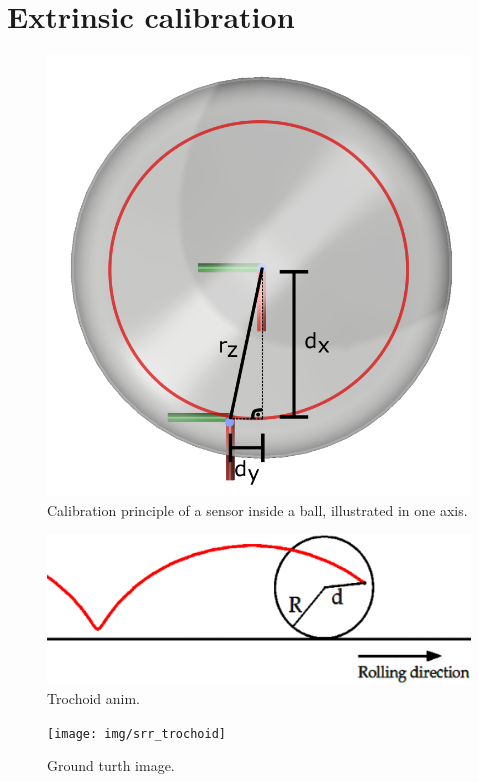 \section{Extrinsic calibration}

\begin{figure}
  \centering
  \includegraphics[width=.5\linewidth]{img/calibsphere}
  \caption{Calibration principle of a sensor inside a ball, illustrated in one axis.}
  \label{fig:calibsphere}
\end{figure}

\begin{figure}
  \centering
  \includegraphics[width=\linewidth]{img/trochoidanim}
  \caption{Trochoid anim.}
  \label{fig:trochoidanim}
\end{figure}

\begin{figure}
  \centering
  \texttt{[image: img/srr\_trochoid]}
  \caption{Ground turth image.}
  \label{fig:srrtrochoid}
\end{figure}

